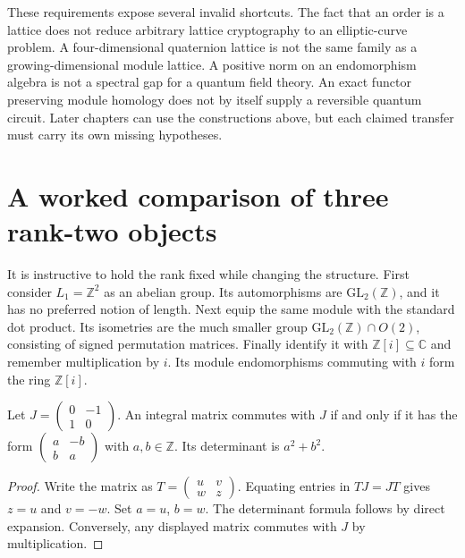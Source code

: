 These requirements expose several invalid shortcuts. The fact
that an order is a lattice does not reduce arbitrary lattice
cryptography to an elliptic-curve problem. A four-dimensional
quaternion lattice is not the same family as a growing-dimensional
module lattice. A positive norm on an endomorphism algebra is not
a spectral gap for a quantum field theory. An exact functor
preserving module homology does not by itself supply a reversible
quantum circuit. Later chapters can use the constructions above,
but each claimed transfer must carry its own missing hypotheses.

\section{A worked comparison of three rank-two objects}

It is instructive to hold the rank fixed while changing the
structure. First consider $L_1=\mathbb Z^2$ as an abelian group.
Its automorphisms are $\mathrm{GL}_2(\mathbb Z)$, and it has no
preferred notion of length. Next equip the same module with the
standard dot product. Its isometries are the much smaller group
$\mathrm{GL}_2(\mathbb Z)\cap O(2)$, consisting of signed
permutation matrices. Finally identify it with
$\mathbb Z[i]\subseteq\mathbb C$ and remember multiplication
by $i$. Its module endomorphisms commuting with $i$ form the
ring $\mathbb Z[i]$.

\begin{proposition}
Let $J=\left(\begin{smallmatrix}0&-1\\1&0\end{smallmatrix}\right)$.
An integral matrix commutes with $J$ if and only if it has the
form
$\left(\begin{smallmatrix}a&-b\\b&a\end{smallmatrix}\right)$
with $a,b\in\mathbb Z$. Its determinant is $a^2+b^2$.
\end{proposition}

\begin{proof}
Write the matrix as
$T=\left(\begin{smallmatrix}u&v\\w&z\end{smallmatrix}\right)$.
Equating entries in $TJ=JT$ gives $z=u$ and $v=-w$.
Set $a=u$, $b=w$. The determinant formula follows by direct
expansion. Conversely, any displayed matrix commutes with $J$
by multiplication.
\end{proof}

